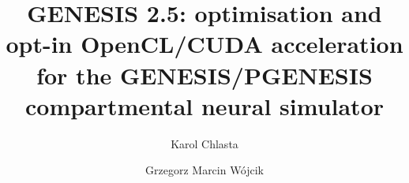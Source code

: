 \documentclass[preprint,12pt, a4paper]{elsarticle}
\begin{document}
\renewcommand{\labelenumii}{\arabic{enumi}.\arabic{enumii}}

\begin{frontmatter}



\title{GENESIS 2.5: optimisation and opt-in OpenCL/CUDA acceleration for the GENESIS/PGENESIS compartmental neural simulator}

\author[1]{Karol Chlasta}
\author[2]{Grzegorz Marcin W\'ojcik}

\address[1]{Kozminski University, ul. Jagiello\'nska 57/59, 03-301 Warsaw, Poland; WarsawIQ, Al. Jana Paw\l{}a II 43A/37B, 01-001 Warsaw, Poland}
\address[2]{Maria Curie-Sk{\l}odowska University, ul. Akademicka 9, 20-033 Lublin, Poland}



\end{frontmatter}
\end{document}
